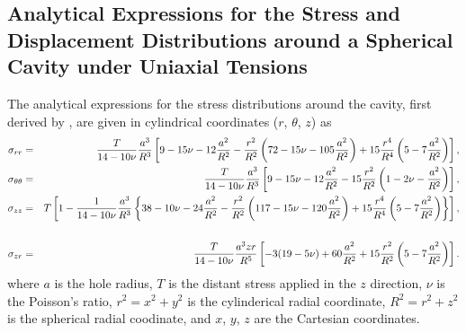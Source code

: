 \documentclass[sn-mathphys,Numbered]{sn-jnl}%
\begin{document}
\begin{appendices}
\section{Analytical Expressions for the Stress and Displacement Distributions around a Spherical Cavity under Uniaxial Tensions}
\label{app:sphericalCavity}
The analytical expressions for the stress distributions around the cavity, first derived by \citet{Southwell1926}, are given in cylindrical coordinates ($r$, $\theta$, $z$) as
\begin{eqnarray}
	\sigma_{rr} &=&
		\frac{T}{14 - 10\nu} \frac{a^3}{R^3}
		\left[ 9 - 15\nu - 12 \frac{a^2}{R^2}  - \frac{r^2}{R^2} \left( 72 - 15\nu - 105 \frac{a^2}{R^2} \right) + 15 \frac{r^4}{R^4} \left( 5 - 7 \frac{a^2}{R^2} \right) \right], \\
	\sigma_{\theta\theta} &=&
		\frac{T}{14 - 10\nu} \frac{a^3}{R^3}
		\left[ 9 - 15\nu - 12 \frac{a^2}{R^2}  - 15 \frac{r^2}{R^2} \left( 1 - 2\nu - \frac{a^2}{R^2} \right) \right], \\
	\sigma_{zz} &=&
		T \left[ 1 - \frac{1}{14 - 10\nu} \frac{a^3}{R^3} \left\{ 38 - 10\nu - 24 \frac{a^2}{R^2} 
		- \frac{r^2}{R^2} \left( 117 - 15\nu - 120 \frac{a^2}{R^2} \right)
		+ 15 \frac{r^4}{R^4} \left( 5 - 7 \frac{a^2}{R^2} \right) \right\} \right], \notag \\
		\\
	\sigma_{zr} &=&
	\frac{T}{14 - 10\nu} \frac{a^3 z r}{R^5}
	\left[ -3(19 - 5\nu) + 60 \frac{a^2}{R^2} + 15 \frac{r^2}{R^2} \left( 5 - 7 \frac{a^2}{R^2} \right)  \right].
\end{eqnarray}
where $a$ is the hole radius, $T$ is the distant stress applied in the $z$ direction, $\nu$ is the Poisson's ratio, $r^2 = x^2 + y^2$ is the cylinderical radial coordinate, $R^2 = r^2 + z^2$ is the spherical radial coodinate, and $x$, $y$, $z$ are the Cartesian coordinates.


\end{appendices}
\end{document}
